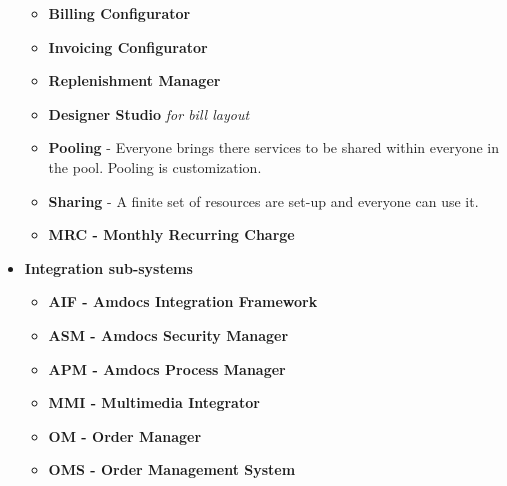 \documentclass[12pt,twoside]{article}
\begin{document}
\begin{itemize}
\begin{itemize}
\item \textbf{Billing Configurator}
\item \textbf{Invoicing Configurator}
\item \textbf{Replenishment Manager}
\item \textbf{Designer Studio} \emph{for bill layout}
\item \textbf{Pooling} - Everyone brings there services to be shared within
     everyone in the pool. Pooling is customization.
\item \textbf{Sharing} - A finite set of resources are set-up and everyone can
     use it.
\item \textbf{MRC - Monthly Recurring Charge}
\end{itemize}
\item \textbf{Integration sub-systems}
\begin{itemize}
\item \textbf{AIF - Amdocs Integration Framework}
\item \textbf{ASM - Amdocs Security Manager}
\item \textbf{APM - Amdocs Process Manager}
\item \textbf{MMI - Multimedia Integrator}
\item \textbf{OM - Order Manager}
\item \textbf{OMS - Order Management System}
\end{itemize}
\end{itemize}
\vspace*{2.5cm} 
\noindent{}
\end{document}
